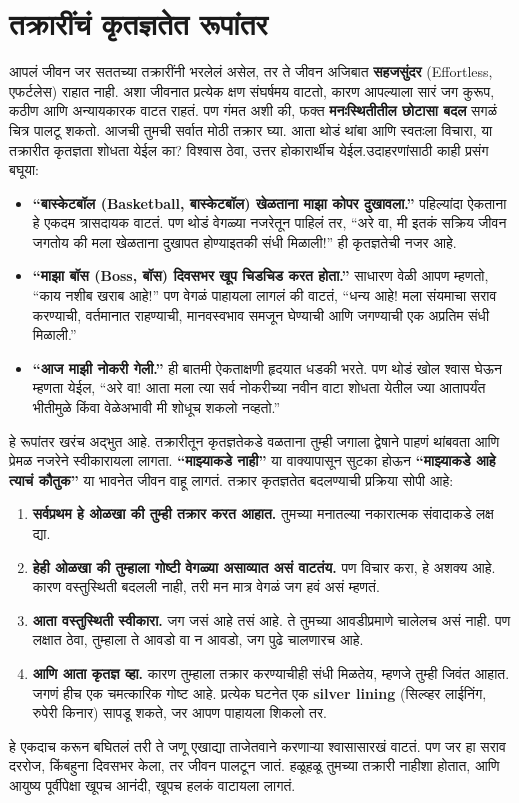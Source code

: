  \chapter{तक्रारींचं कृतज्ञतेत रूपांतर}
आपलं जीवन जर सततच्या तक्रारींनी भरलेलं असेल, तर ते जीवन अजिबात \textbf{सहजसुंदर} (Effortless,  एफर्टलेस) राहात नाही. अशा जीवनात प्रत्येक क्षण संघर्षमय वाटतो, कारण आपल्याला सारं जग कुरूप, कठीण आणि अन्यायकारक वाटत राहतं. पण गंमत अशी की, फक्त \textbf{मनःस्थितीतील छोटासा बदल} सगळं चित्र पालटू शकतो.
आजची तुमची सर्वात मोठी तक्रार घ्या. आता थोडं थांबा आणि स्वतःला विचारा,  या तक्रारीत कृतज्ञता शोधता येईल का? विश्वास ठेवा, उत्तर होकारार्थीच येईल.उदाहरणांसाठी काही प्रसंग बघूया:
\begin{itemize}
 \item \textbf{``बास्केटबॉल (Basketball,  बास्केटबॉल) खेळताना माझा कोपर दुखावला.''} पहिल्यांदा ऐकताना हे एकदम त्रासदायक वाटतं. पण थोडं वेगळ्या नजरेतून पाहिलं तर,  ``अरे वा, मी इतकं सक्रिय जीवन जगतोय की मला खेळताना दुखापत होण्याइतकी संधी मिळाली!'' ही कृतज्ञतेची नजर आहे.
\item \textbf{``माझा बॉस (Boss,  बॉस) दिवसभर खूप चिडचिड करत होता.''} साधारण वेळी आपण म्हणतो, 
 ``काय नशीब खराब आहे!'' पण वेगळं पाहायला लागलं की वाटतं,  ``धन्य आहे! मला संयमाचा सराव करण्याची,
 वर्तमानात राहण्याची, मानवस्वभाव समजून घेण्याची आणि जगण्याची एक अप्रतिम संधी मिळाली.''
\item \textbf{``आज माझी नोकरी गेली.''} ही बातमी ऐकताक्षणी हृदयात धडकी भरते. पण थोडं खोल श्वास घेऊन म्हणता येईल,  ``अरे वा! आता मला त्या सर्व नोकरीच्या नवीन वाटा शोधता येतील ज्या आतापर्यंत भीतीमुळे किंवा वेळेअभावी मी शोधूच शकलो नव्हतो.''
 \end{itemize}
हे रूपांतर खरंच अद्भुत आहे. तक्रारीतून कृतज्ञतेकडे वळताना तुम्ही जगाला द्वेषाने पाहणं थांबवता आणि प्रेमळ नजरेने स्वीकारायला लागता. \textbf{``माझ्याकडे नाही''} या वाक्यापासून सुटका होऊन \textbf{``माझ्याकडे आहे त्याचं कौतुक''} या भावनेत जीवन वाहू लागतं.
तक्रार कृतज्ञतेत बदलण्याची प्रक्रिया सोपी आहे:
\begin{enumerate}
 \item \textbf{सर्वप्रथम हे ओळखा की तुम्ही तक्रार करत आहात.}
 तुमच्या मनातल्या नकारात्मक संवादाकडे लक्ष द्या.
\item \textbf{हेही ओळखा की तुम्हाला गोष्टी वेगळ्या असाव्यात असं वाटतंय.} पण विचार करा, हे अशक्य आहे.
 कारण वस्तुस्थिती बदलली नाही, तरी मन मात्र वेगळं जग हवं असं म्हणतं.
\item \textbf{आता वस्तुस्थिती स्वीकारा.} जग जसं आहे तसं आहे. ते तुमच्या आवडीप्रमाणे चालेलच असं नाही.
 पण लक्षात ठेवा, तुम्हाला ते आवडो वा न आवडो, जग पुढे चालणारच आहे.
\item \textbf{आणि आता कृतज्ञ व्हा.} कारण तुम्हाला तक्रार करण्याचीही संधी मिळतेय, म्हणजे तुम्ही जिवंत आहात. जगणं हीच एक चमत्कारिक गोष्ट आहे. प्रत्येक घटनेत एक \textbf{silver lining} (सिल्व्हर लाईनिंग,  रुपेरी किनार) सापडू शकते, जर आपण पाहायला शिकलो तर.
 \end{enumerate}
हे एकदाच करून बघितलं तरी ते जणू एखाद्या ताजेतवाने करणाऱ्या श्वासासारखं वाटतं. पण जर हा सराव दररोज,
 किंबहुना दिवसभर केला, तर जीवन पालटून जातं. हळूहळू तुमच्या तक्रारी नाहीशा होतात, आणि आयुष्य पूर्वीपेक्षा
 खूपच आनंदी, खूपच हलकं वाटायला लागतं.
